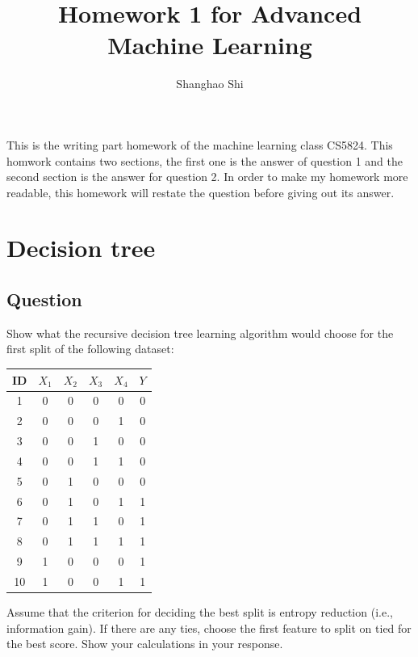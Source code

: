 \documentclass[10pt]{article}
\title{
		\textbf{Homework 1 for Advanced Machine Learning}
	}
\author{Shanghao Shi}
\begin{document}
	\maketitle
	This is the writing part homework of the machine learning class CS5824. This homwork contains two sections, the first one is the answer of question 1 and the second section is the answer for question 2. In order to make my homework more readable, this homework will restate the question before giving out its answer.
	
	\section{Decision tree}
	\subsection{Question}
	Show what the recursive decision tree learning algorithm would choose for the first split of the following dataset:
	
	\begin{center}
	\begin{tabular}{c|cccc|c}
		\toprule
		ID & $X_1$ & $X_2$& $X_3$ & $X_4$ & $Y$\\
		\midrule
		1 & 0 & 0 & 0 & 0 & 0\\
		2 & 0 & 0 & 0 & 1 & 0\\
		3 & 0 & 0 & 1 & 0 & 0\\
		4 & 0 & 0 & 1 & 1 & 0\\
		5 & 0 & 1 & 0 & 0 & 0\\
		6 & 0 & 1 & 0 & 1 & 1\\ 
		7 & 0 & 1 & 1 & 0 & 1\\ 
		8 & 0 & 1 & 1 & 1 & 1\\ 
		9 & 1 & 0 & 0 & 0 & 1\\ 
		10 & 1 & 0 & 0 & 1 & 1\\ 
		\bottomrule
	\end{tabular}
	\end{center}

	Assume that the criterion for deciding the best split is entropy reduction (i.e., information gain). If there are any ties, choose the first feature to split on tied for the best score. Show your calculations in your response.
	
\end{document}
